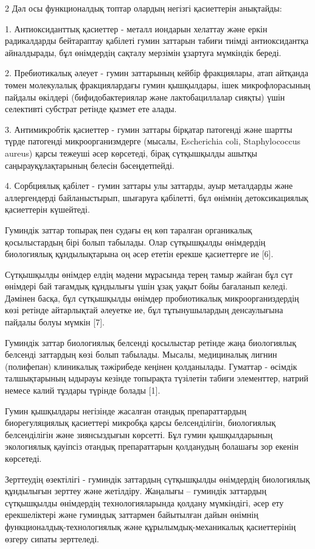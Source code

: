 \begin{multicols}{2}
Дәл осы функционалдық топтар олардың негізгі қасиеттерін анықтайды:

1. Антиоксиданттық қасиеттер - металл иондарын хелаттау және еркін
радикалдарды бейтараптау қабілеті гумин заттарын табиғи тиімді
антиоксидантқа айналдырады, бұл өнімдердің сақталу мерзімін ұзартуға
мүмкіндік береді.

2. Пребиотикалық әлеует - гумин заттарының кейбір фракциялары, атап
айтқанда төмен молекулалық фракциялардағы гумин қышқылдары, ішек
микрофлорасының пайдалы өкілдері (бифидобактериялар және
лактобациллалар сияқты) үшін селективті субстрат ретінде қызмет ете
алады.

3. Антимикробтік қасиеттер - гумин заттары бірқатар патогенді және шартты
түрде патогенді микроорганизмдерге (мысалы, Escherichia coli,
Staphylococcus aureus) қарсы тежеуші әсер көрсетеді, бірақ сүтқышқылды
ашытқы саңырауқұлақтарының белесін бәсеңдетпейді.

4. Сорбциялық қабілет - гумин заттары улы заттарды, ауыр металдарды және
аллергендерді байланыстырып, шығаруға қабілетті, бұл өнімнің
детоксикациялық қасиеттерін күшейтеді.

Гуминдік заттар топырақ пен судағы ең көп таралған органикалық
қосылыстардың бірі болып табылады. Олар сүтқышқылды өнімдердің
биологиялық құндылықтарына оң әсер ететін ерекше қасиеттерге ие {[}6{]}.

Сүтқышқылды өнімдер елдің мәдени мұрасында терең тамыр жайған бұл сүт
өнімдері бай тағамдық құндылығы үшін ұзақ уақыт бойы бағаланып келеді.
Дәмінен басқа, бұл сүтқышқылды өнімдер пробиотикалық микроорганиздердің
көзі ретінде айтарлықтай әлеуетке ие, бұл тұтынушылардың денсаулығына
пайдалы болуы мүмкін {[}7{]}.

Гуминдік заттар биологиялық белсенді қосылыстар ретінде жаңа биологиялық
белсенді заттардың көзі болып табылады. Мысалы, медициналық лигнин
(полифепан) клиникалық тәжірибеде кеңінен қолданылады. Гуматтар -
өсімдік талшықтарының ыдырауы кезінде топырақта түзілетін табиғи
элементтер, натрий немесе калий тұздары түрінде болады {[}1{]}.

Гумин қышқылдары негізінде жасалған отандық препараттардың
биорегуляциялық қасиеттері микробқа қарсы белсенділігін, биологиялық
белсенділігін және зиянсыздығын көрсетті. Бұл гумин қышқылдарының
экологиялық қауіпсіз отандық препараттарын қолданудың болашағы зор
екенін көрсетеді.

Зерттеудің өзектілігі - гуминдік заттардың сүтқышқылды өнімдердің
биологиялық құндылығын зерттеу және жетілдіру. Жаңалығы -- гуминдік
заттардың сүтқышқылды өнімдердің технологияларында қолдану мүмкіндігі,
әсер ету ерекшеліктері және гуминдық заттармен байытылған дайын өнімнің
функционалдық-технологиялық және құрылымдық-механикалық қасиеттерінің
өзгеру сипаты зерттеледі.


\end{multicols}
